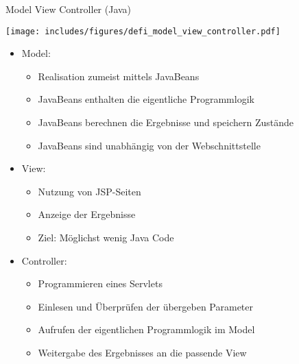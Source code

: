 \begin{defi}{Model View Controller (Java)}
    \begin{center}
        \texttt{[image: includes/figures/defi\_model\_view\_controller.pdf]}
    \end{center}

    \begin{itemize}
        \item Model:
              \begin{itemize}
                  \item Realisation zumeist mittels JavaBeans
                  \item JavaBeans enthalten die eigentliche Programmlogik
                  \item JavaBeans berechnen die Ergebnisse und speichern Zustände
                  \item JavaBeans sind unabhängig von der Webschnittstelle
              \end{itemize}
        \item View:
              \begin{itemize}
                  \item Nutzung von JSP-Seiten
                  \item Anzeige der Ergebnisse
                  \item Ziel: Möglichst wenig Java Code
              \end{itemize}
        \item Controller:
              \begin{itemize}
                  \item Programmieren eines Servlets
                  \item Einlesen und Überprüfen der übergeben Parameter
                  \item Aufrufen der eigentlichen Programmlogik im Model
                  \item Weitergabe des Ergebnisses an die passende View
              \end{itemize}
    \end{itemize}
\end{defi}

